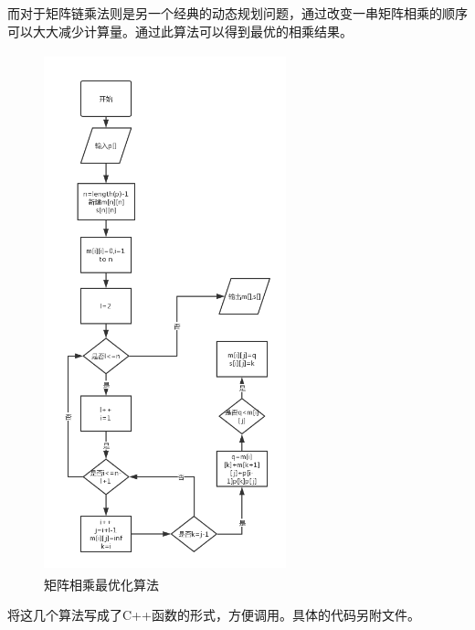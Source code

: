 \documentclass[UTF8]{ctexart}
\begin{document}
	\par
	而对于矩阵链乘法则是另一个经典的动态规划问题，通过改变一串矩阵相乘的顺序可以大大减少计算量。通过此算法可以得到最优的相乘结果。
	\begin{figure}[h]
		\centering
		\includegraphics[width=7cm,height=15cm]{3}
		\caption{矩阵相乘最优化算法}
	\end{figure}
	\par
	将这几个算法写成了C++函数的形式，方便调用。具体的代码另附文件。
\end{document}
